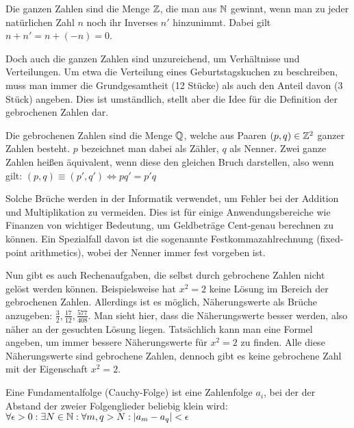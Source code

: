 \begin{definition}
	Die ganzen Zahlen sind die Menge $\mathbb{Z}$, die man aus $\mathbb{N}$ gewinnt, wenn man zu jeder natürlichen Zahl $n$ noch ihr Inverses $n'$ hinzunimmt. Dabei gilt $n+n' = n+(-n) = 0$.
\end{definition}

Doch auch die ganzen Zahlen sind unzureichend, um Verhältnisse und Verteilungen. Um etwa die Verteilung eines Geburtstagskuchen zu beschreiben, muss man immer die Grundgesamtheit (12 Stücke) als auch den Anteil
davon (3 Stück) angeben. Dies ist umständlich, stellt aber die Idee für die Definition der gebrochenen Zahlen dar.

\begin{definition}
	Die gebrochenen Zahlen sind die Menge $\mathbb{Q}$, welche aus Paaren $(p,q) \in \mathbb{Z}^2$ ganzer Zahlen besteht. $p$ bezeichnet man dabei als Zähler, $q$ als Nenner. Zwei ganze Zahlen heißen äquivalent,  wenn
	diese den gleichen Bruch darstellen, also wenn gilt: $(p,q) \equiv (p',q') \iff pq'=p'q$	
\end{definition}

Solche Brüche werden in der Informatik verwendet, um Fehler bei der Addition und Multiplikation zu vermeiden. Dies ist für einige Anwendungsbereiche wie Finanzen von wichtiger Bedeutung, um Geldbeträge
Cent-genau berechnen zu können. Ein Spezialfall davon ist die sogenannte Festkommazahlrechnung (fixed-point arithmetics), wobei der Nenner immer fest vorgeben ist.

Nun gibt es auch Rechenaufgaben, die selbst durch gebrochene Zahlen nicht gelöst werden können. Beispielsweise hat $x^2=2$ keine Lösung im Bereich der gebrochenen Zahlen. Allerdings ist es möglich,
Näherungswerte als Brüche anzugeben: $\frac{3}{2}, \frac{17}{12},\frac{577}{408}$. Man sieht hier, dass die Näherungswerte besser werden, also näher an der gesuchten Lösung liegen. Tatsächlich kann man
eine Formel angeben, um immer bessere Näherungswerte für $x^2=2$ zu finden. Alle diese Näherungswerte sind gebrochene Zahlen, dennoch gibt es keine gebrochene Zahl mit der Eigenschaft $x^2=2$.

\begin{definition}[Fundamentalfolge]
	Eine Fundamentalfolge (Cauchy-Folge) ist eine Zahlenfolge $a_i$, bei der der Abstand der zweier Folgenglieder beliebig klein wird: $\forall \epsilon > 0: \exists N \in \mathbb{N}: \forall m,q>N: |a_m-a_q|<\epsilon$
\end{definition}

